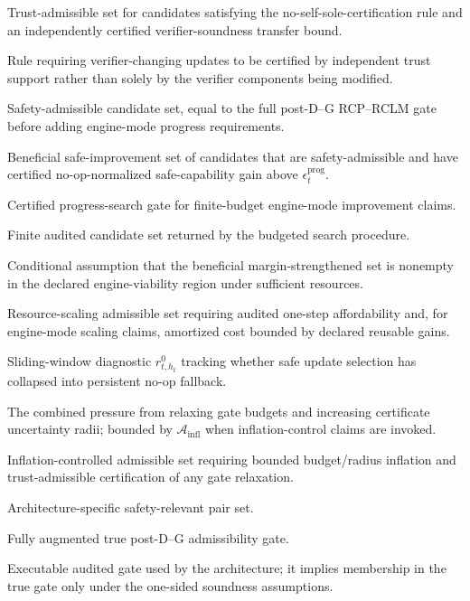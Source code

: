 \documentclass[11pt,a4paper]{article}
\newcommand{\Pcal}{\mathcal P}
\newcommand{\Acal}{\mathcal A}
\newcommand{\RCP}{\mathrm{RCP}}
\newcommand{\RCLM}{\mathrm{RCLM}}
\newcommand{\DG}{\mathrm{DG}}
\newcommand{\safe}{\mathrm{safe}}
\newcommand{\search}{\mathrm{search}}
\newcommand{\trust}{\mathrm{trust}}
\newcommand{\scale}{\mathrm{scale}}
\newcommand{\infl}{\mathrm{infl}}
\begin{document}
\begin{description}[leftmargin=2.8cm, style=nextline]
    \item[\(\Acal_{\trust}\)] Trust-admissible set for candidates satisfying the no-self-sole-certification rule and an independently certified verifier-soundness transfer bound.
    \item[No self-sole-certification] Rule requiring verifier-changing updates to be certified by independent trust support rather than solely by the verifier components being modified.
    \item[\(\Acal_t^{\safe}\)] Safety-admissible candidate set, equal to the full post-D--G RCP--RCLM gate before adding engine-mode progress requirements.
    \item[\(\mathcal I_t\)] Beneficial safe-improvement set of candidates that are safety-admissible and have certified no-op-normalized safe-capability gain above \(\epsilon_t^{\mathrm{prog}}\).
    \item[\(\Acal_{\mathrm{prog}}\)] Certified progress-search gate for finite-budget engine-mode improvement claims.
    \item[\(S_t(B_t^{\search})\)] Finite audited candidate set returned by the budgeted search procedure.
    \item[Persistent improvement condition] Conditional assumption that the beneficial margin-strengthened set is nonempty in the declared engine-viability region under sufficient resources.
    \item[\(\Acal_{\scale}\)] Resource-scaling admissible set requiring audited one-step affordability and, for engine-mode scaling claims, amortized cost bounded by declared reusable gains.
    \item[No-op rate monitor] Sliding-window diagnostic \(r_{t,h_t}^{0}\) tracking whether safe update selection has collapsed into persistent no-op fallback.
    \item[Certificate inflation] The combined pressure from relaxing gate budgets and increasing certificate uncertainty radii; bounded by \(\Acal_{\infl}\) when inflation-control claims are invoked.
    \item[\(\Acal_{\infl}\)] Inflation-controlled admissible set requiring bounded budget/radius inflation and trust-admissible certification of any gate relaxation.
    \item[\(\Pcal_t^{\RCLM}\)] Architecture-specific safety-relevant pair set.
    \item[\(\Acal_{\RCP}^{\RCLM\text{-}\DG}\)] Fully augmented true post-D--G admissibility gate.
    \item[\(\widehat{\Acal}_{\RCP}^{\RCLM\text{-}\DG}\)] Executable audited gate used by the architecture; it implies membership in the true gate only under the one-sided soundness assumptions.

\end{description}
\end{document}
